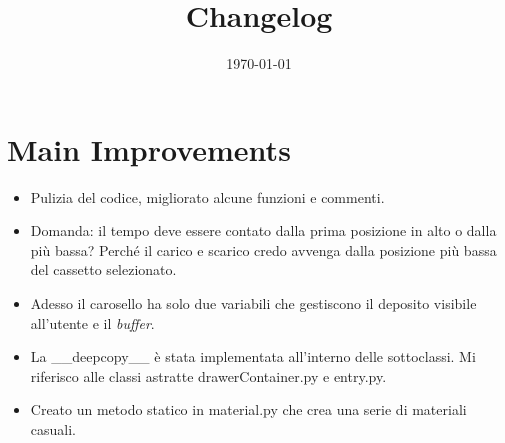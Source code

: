 \documentclass[a4paper]{article}
\begin{document}
	\title{Changelog}
	\date{\today}
	\maketitle
	
	\newpage
	
	\section*{Main Improvements}
	
	\begin{itemize}[label=]
		\item Pulizia del codice, migliorato alcune funzioni e commenti.
		
		\item Domanda: il tempo deve essere contato dalla prima posizione in alto o dalla più bassa? Perché il carico e scarico credo avvenga dalla posizione più bassa del cassetto selezionato.
		
		\item Adesso il carosello ha solo due variabili che gestiscono il deposito visibile all'utente e il \emph{buffer}.
		
		\item La \textsf{\_\_deepcopy\_\_} è stata implementata all'interno delle sottoclassi. Mi riferisco alle classi astratte \textsf{drawerContainer.py} e \textsf{entry.py}.
		
		\item Creato un metodo statico in \textsf{material.py} che crea una serie di materiali casuali.
	\end{itemize}
\end{document}
